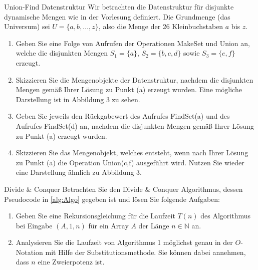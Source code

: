 \documentclass{article}
\begin{document}
\begin{exercise}{Union-Find Datenstruktur}
  Wir betrachten die Datenstruktur für disjunkte dynamische Mengen wie in der Vorlesung definiert. Die Grundmenge (das Universum) sei $U = \{a, b, . . . , z\}$, also die Menge der 26 Kleinbuchstaben $a$ bis $z$.
  \begin{enumerate}
    \item Geben Sie eine Folge von Aufrufen der Operationen MakeSet und Union an, welche die disjunkten Mengen $S_1 = \{a\}$, $S_2 = \{b, c, d\}$ sowie $S_3 = \{e, f\}$ erzeugt.
    \item Skizzieren Sie die Mengenobjekte der Datenstruktur, nachdem die disjunkten Mengen gemäß Ihrer Lösung zu Punkt (a) erzeugt wurden. Eine mögliche Darstellung ist in Abbildung 3 zu sehen.
    \item Geben Sie jeweils den Rückgabewert des Aufrufes FindSet(a) und des Aufrufes FindSet(d) an, nachdem die disjunkten Mengen gemäß Ihrer Lösung zu Punkt (a) erzeugt wurden.
    \item Skizzieren Sie das Mengenobjekt, welches entsteht, wenn nach Ihrer Lösung zu Punkt (a) die Operation Union(c,f) ausgeführt wird. Nutzen Sie wieder eine Darstellung ähnlich zu Abbildung 3.
  \end{enumerate}
  

  \begin{solution}

  \end{solution}
\end{exercise}

\begin{exercise}{Divide \& Conquer}
  Betrachten Sie den Divide \& Conquer Algorithmus, dessen Pseudocode in \ref{alg:Algo} gegeben ist und lösen Sie folgende Aufgaben:
  \begin{enumerate}
    \item Geben Sie eine Rekursionsgleichung für die Laufzeit $T(n)$ des Algorithmus bei Eingabe $(A, 1, n)$ für ein Array $A$ der Länge $n \in \mathbb{N}$ an.
    \item Analysieren Sie die Laufzeit von Algorithmus 1 möglichst genau in der $O$-Notation mit Hilfe der Substitutionsmethode. Sie können dabei annehmen, dass $n$ eine Zweierpotenz ist.
  \end{enumerate}
  

  \begin{solution}

  \end{solution}
\end{exercise}
\end{document}
